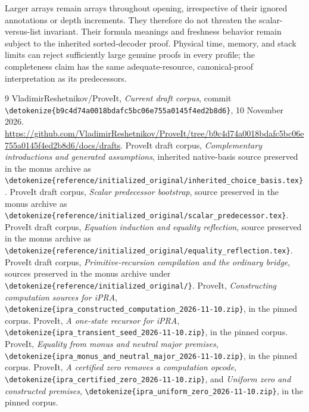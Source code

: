 \documentclass[11pt,letterpaper]{article}
\theoremstyle{definition}\newtheorem{definition}[theorem]{Definition}
\theoremstyle{remark}\newtheorem{remark}[theorem]{Remark}
\newcommand{\file}[1]{\expandafter\nolinkurl\expandafter{\detokenize{#1}}}
\begin{document}
Larger arrays remain arrays throughout opening, irrespective of their
ignored annotations or depth increments.  They therefore do not
threaten the scalar-versus-list invariant.  Their formula meanings and
freshness behavior remain subject to the inherited sorted-decoder
proof.  Physical time, memory, and stack limits can reject sufficiently
large genuine proofs in every profile; the completeness claim has the
same adequate-resource, canonical-proof interpretation as its
predecessors.


\clearpage
\begin{thebibliography}{9}
 VladimirReshetnikov/ProveIt, \emph{Current draft corpus},
commit \file{b9c4d74a0018bdafc5bc06e755a0145f4ed2b8d6}, 10 November 2026.
\url{https://github.com/VladimirReshetnikov/ProveIt/tree/b9c4d74a0018bdafc5bc06e755a0145f4ed2b8d6/docs/drafts}.
 ProveIt draft corpus, \emph{Complementary introductions
and generated assumptions}, inherited native-basis source preserved in the
monus archive as \file{reference/initialized_original/inherited_choice_basis.tex}.
 ProveIt draft corpus, \emph{Scalar predecessor bootstrap},
source preserved in the monus archive as
\file{reference/initialized_original/scalar_predecessor.tex}.
 ProveIt draft corpus, \emph{Equation induction and equality
reflection}, source preserved in the monus archive as
\file{reference/initialized_original/equality_reflection.tex}.
 ProveIt draft corpus, \emph{Primitive-recursion compilation
and the ordinary bridge}, sources preserved in the monus archive under
\file{reference/initialized_original/}.
 ProveIt, \emph{Constructing computation sources for iPRA},
\file{ipra_constructed_computation_2026-11-10.zip}, in the pinned corpus.
 ProveIt, \emph{A one-state recursor for iPRA},
\file{ipra_transient_seed_2026-11-10.zip}, in the pinned corpus.
 ProveIt, \emph{Equality from monus and neutral major premises},
\file{ipra_monus_and_neutral_major_2026-11-10.zip}, in the pinned corpus.
 ProveIt, \emph{A certified zero removes a computation opcode},
\file{ipra_certified_zero_2026-11-10.zip}, and \emph{Uniform zero and constructed
premises}, \file{ipra_uniform_zero_2026-11-10.zip}, in the pinned corpus.
\end{thebibliography}
\end{document}
